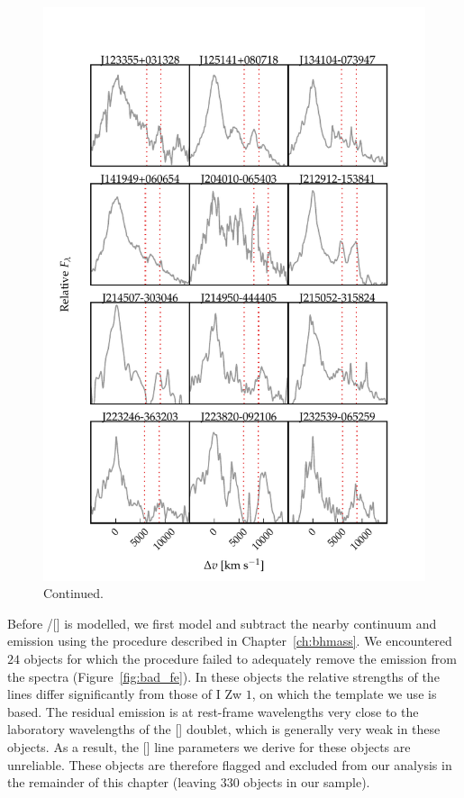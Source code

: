 \begin{figure}
\ContinuedFloat
    \centering
    \includegraphics[width=\columnwidth]{figures/chapter04/example_spectrum_grid_extreme_fe_2.pdf}
    \caption[]{Continued.}
\end{figure}

Before \hbns/[] is modelled, we first model and subtract the nearby continuum and  emission using the procedure described in Chapter~\ref{ch:bhmass}.
We encountered $24$ objects for which the procedure failed to adequately remove the  emission from the spectra (Figure~\ref{fig:bad_fe}).
In these objects the relative strengths of the  lines differ significantly from those of I Zw $1$, on which the \citet{boroson92}  template we use is based.
The residual  emission is at rest-frame wavelengths very close to the laboratory wavelengths of the [] doublet, which is generally very weak in these objects.
As a result, the [] line parameters we derive for these objects are unreliable.
These objects are therefore flagged and excluded from our analysis in the remainder of this chapter (leaving $330$ objects in our sample).

